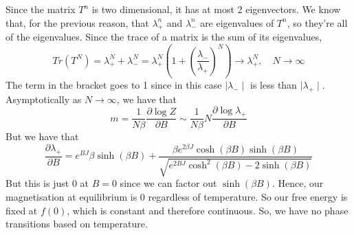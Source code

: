Since the matrix $ T ^ n $ is two dimensional, it has at most 2 eigenvectors. 
We know that, for the previous reason, that $ \lambda_+ ^ n $ and  $ \lambda_-^ n $ 
are eigenvalues of  $ T ^n $, so they're all of the eigenvalues. 
Since the trace of a matrix is the sum of its eigenvalues, 
 \[
	 Tr ( T ^ N ) = \lambda_+^ N + \lambda_- ^ N  = \lambda_+^N ( 1 + (\frac{\lambda_-}{\lambda_+ })^ N) \to \lambda_+^N , \quad N \to \infty 
\] The term in the bracket goes to 1 since in this case $  \mid \lambda_-  \mid $ is less than $  \mid  \lambda_+  \mid $. 
Asymptotically as $ N \to \infty$, we have that 
\[
 m  = \frac{1}{N \beta } \frac{\partial \log Z}{\partial B } \sim \frac{1}{N \beta } N \frac{\partial \log \lambda_+ }{\partial B } 
\] But we have that 
\[
	\frac{\partial  \lambda_+ }{\partial B }  = e^{ B J }\beta \sinh ( \beta B ) + \frac{\beta e^{ 2 \beta J } \cosh ( \beta B ) \sinh ( \beta B ) }{\sqrt{ e ^{ 2 B J } \cosh ^ 2 ( \beta B ) - 2 \sinh ( \beta B ) } }
\] But this is just $0 $ at $ B = 0 $ since we can factor out $ \sinh ( \beta B ) $. 
Hence, our magnetisation at equilibrium is  $ 0 $ regardless of temperature. 
So our free energy is fixed at $ f( 0 )$, which is constant and therefore continuous. So, 
we have no phase transitions based on temperature. 

\pagebreak 
